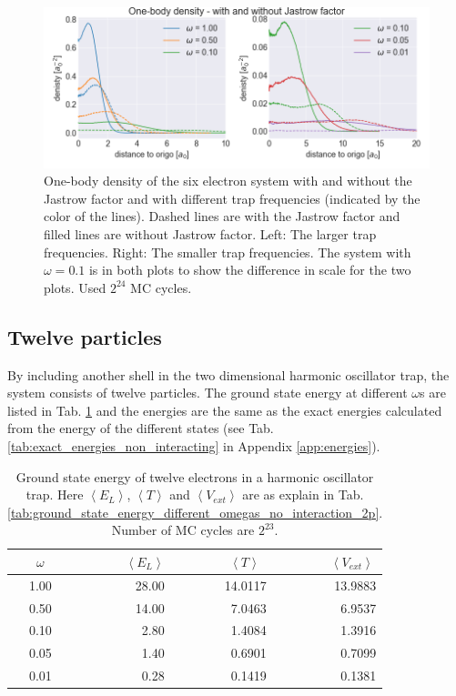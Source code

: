 \begin{figure}[H]
\center
\includegraphics[width=0.85\linewidth]{../Results/one_body_density_interaction_6p}\caption{One-body density of the six electron system with and without the Jastrow factor and with different trap frequencies (indicated by the color of the lines). Dashed lines are with the Jastrow factor and filled lines are without Jastrow factor. Left: The larger trap frequencies. Right: The smaller trap frequencies.  The system with $\omega = 0.1$ is in both plots to show the difference in scale for the two plots. Used $2^{24}$ MC cycles. }\label{fig:one_body_density_interaction_6p}
\end{figure}


\subsection{Twelve particles}

By including another shell in the two dimensional harmonic oscillator trap, the system consists of twelve particles. The ground state energy at different $\omega$s are listed in Tab. \ref{tab:ground_state_energy_importance_12p} and the energies are the same as the exact energies calculated from the energy of the different states (see Tab. \ref{tab:exact_energies_non_interacting} in Appendix \ref{app:energies}).

\begin{table}[H]\caption{Ground state energy of twelve electrons in a harmonic oscillator trap. Here $\left< E_L \right>$, $\left< T \right>$ and $\left< V_{ext}\right>$  are as explain in Tab. \ref{tab:ground_state_energy_different_omegas_no_interaction_2p}. Number of MC cycles are $2^{23}$. }\label{tab:ground_state_energy_importance_12p}
\center
\begin{tabular}{c|rrr}
$\omega$ & $\left< E_L \right>$  & $\left< T \right>\,\,\,$  & $\left< V_{ext}\right>\,$ \\ \hline
1.00 & 28.00 & 14.0117 & 13.9883\\ 
0.50 & 14.00 & 7.0463 & 6.9537\\ 
0.10 & 2.80 & 1.4084 & 1.3916\\ 
0.05 & 1.40 & 0.6901 & 0.7099\\ 
0.01 & 0.28 & 0.1419 & 0.1381\\ 
\end{tabular}
\end{table}

